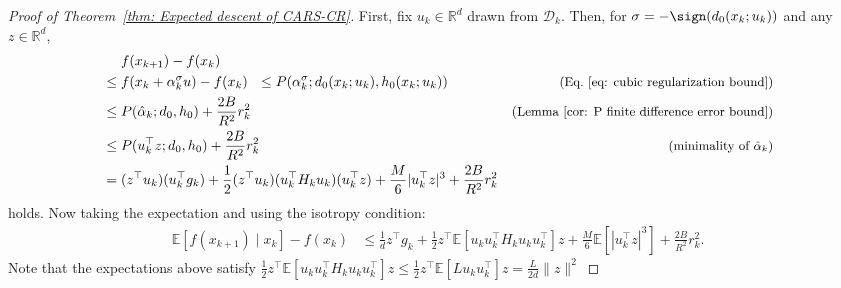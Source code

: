 


\begin{proof}[Proof of Theorem~\ref{thm: Expected descent of CARS-CR}]
    First, fix $u_k \in \mathbb{R}^d$ drawn from $\mathcal{D}_k$. Then, for $\sigma = -\sign(d_0(x_k;u_k))$ and any $z \in \mathbb{R}^d$,
    \begin{align*}
                                                                   & \quad~f(x_{k+1}) - f(x_k)                                                                                                                                                                                       \\
                                                                   & \leq  f(x_k + \alpha_k^{\sigma} u) -f(x_k)
        ~~ \leq P(\alpha_k^{\sigma}; d_0(x_k; u_k), h_0(x_k; u_k)) & \text{\small (Eq.~\eqref{eq: cubic regularization bound})}                                                                                                                                                      \\
                                                                   & \leq P(\hat{\alpha}_k; d_0, h_0) + \frac{2B}{R^2}r_k^2                                                                                       & \text{(\small Lemma~\ref{cor: P finite difference error bound})} \\
                                                                   & \leq P(u_k^{\top}z; d_0, h_0) + \frac{2B}{R^2}r_k^2                                                                                          & \text{\small (minimality of $\hat{\alpha}_k$)}                   \\
                                                                   & = (z^{\top}u_k)(u_k^{\top}g_k) + \frac{1}{2}(z^{\top}u_k)(u_k^{\top}H_k u_k)(u_k^{\top}z) + \frac{M}{6}|u_k^{\top}z|^3 + \frac{2B}{R^2}r_k^2 & ~
    \end{align*}
    holds.
    Now taking the expectation and using the isotropy condition:
    \begin{align*}
        \mathbb{E}\left[ f(x_{k+1}) \mid x_k \right] - f(x_k)
         & \leq \frac{1}{d}z^{\top}g_k +
        \frac{1}{2} z^{\top}\mathbb{E} \left[ u_k u_k^{\top} H_k u_k u_k^{\top} \right]z + \frac{M}{6}\mathbb{E}\left[|u_k^{\top} z |^3\right] + \frac{2B}{R^2}r_k^2.
    \end{align*}
    Note that the expectations above satisfy
    $ \frac{1}{2} z^{\top}\mathbb{E} \left[ u_k u_k^{\top} H_k u_k u_k^{\top} \right]z \leq \frac{1}{2}z^{\top}\mathbb{E}\left[Lu_k u_k^{\top}\right]z = \frac{L}{2d}\|z\|^2$

\end{proof}
